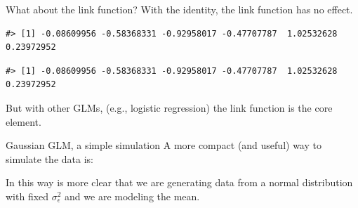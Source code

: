 \documentclass[
  ignorenonframetext,
]{beamer}
\newenvironment{Shaded}{\begin{snugshade}}{\end{snugshade}}
\newcommand{\AttributeTok}[1]{\textcolor[rgb]{0.40,0.45,0.13}{#1}}
\newcommand{\FunctionTok}[1]{\textcolor[rgb]{0.28,0.35,0.67}{#1}}
\newcommand{\NormalTok}[1]{\textcolor[rgb]{0.00,0.23,0.31}{#1}}
\newcommand{\OtherTok}[1]{\textcolor[rgb]{0.00,0.23,0.31}{#1}}
\newcommand{\SpecialCharTok}[1]{\textcolor[rgb]{0.37,0.37,0.37}{#1}}
\begin{document}
\begin{frame}[fragile]{What about the link function?}
\label{what-about-the-link-function-1}
With the identity, the link function has no effect.

\begin{Shaded}
\end{Shaded}

\begin{verbatim}
#> [1] -0.08609956 -0.58368331 -0.92958017 -0.47707787  1.02532628  0.23972952
\end{verbatim}

\begin{Shaded}
\end{Shaded}

\begin{verbatim}
#> [1] -0.08609956 -0.58368331 -0.92958017 -0.47707787  1.02532628  0.23972952
\end{verbatim}

But with other GLMs, (e.g., logistic regression) the link function is
the core element.
\end{frame}

\begin{frame}[fragile]{Gaussian GLM, a simple simulation}
\label{gaussian-glm-a-simple-simulation-5}
A more compact (and useful) way to simulate the data is:

\begin{Shaded}
\end{Shaded}

In this way is more clear that we are generating data from a normal
distribution with fixed \(\sigma^2_{\epsilon}\) and we are modeling the
mean.
\end{frame}
\end{document}
